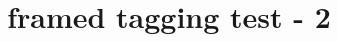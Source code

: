 \documentclass{article}
\title{framed tagging test - 2}
\begin{document}
\begin{framed}
\kant[1-6]
\end{framed}
\end{document}
